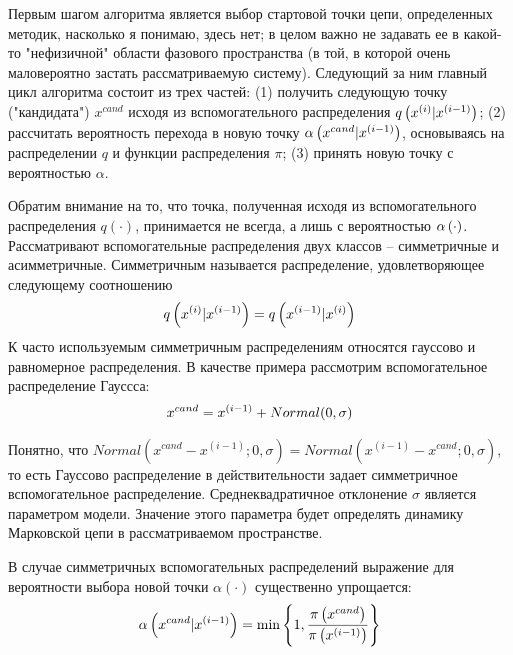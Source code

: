 Первым шагом алгоритма является выбор стартовой точки цепи, определенных методик, насколько я понимаю, здесь нет; в целом важно не задавать ее в какой-то "нефизичной" области фазового пространства (в той, в которой очень маловероятно застать рассматриваемую систему). Следующий за ним главный цикл алгоритма состоит из трех частей: (1) получить следующую точку ("кандидата") $x^{cand}$ исходя из вспомогательного распределения $q \left( x^{(i)} | x^{(i-1)} \right)$; (2) рассчитать вероятность перехода в новую точку $\alpha \left( x^{cand} | x^{(i-1)} \right)$, основываясь на распределении $q$ и функции распределения $\pi$; (3) принять новую точку с вероятностью $\alpha$. \par
Обратим внимание на то, что точка, полученная исходя из вспомогательного распределения $q(\cdot)$, принимается не всегда, а лишь с вероятностью $\alpha \left( \cdot \right)$. Рассматривают вспомогательные распределения двух классов -- симметричные и асимметричные. Симметричным называется распределение, удовлетворяющее следующему соотношению
\begin{gather}
		q \left( x^{(i)} | x^{(i-1)} \right) = q \left( x^{(i-1)} | x^{(i)} \right) \notag
\end{gather}
К часто используемым симметричным распределениям относятся гауссово и равномерное распределения. В качестве примера рассмотрим вспомогательное распределение Гауссса: 
\begin{gather}
		x^{cand} = x^{(i-1)} + Normal(0, \sigma) \notag
\end{gather}

Понятно, что $Normal( x^{cand} - x^{(i-1)}; 0, \sigma ) = Normal( x^{(i-1)} - x^{cand}; 0, \sigma)$, то есть Гауссово распределение в действительности задает симметричное вспомогательное распределение. Среднеквадратичное отклонение $\sigma$ является параметром модели. Значение этого параметра будет определять динамику Марковской цепи в рассматриваемом пространстве. \par
В случае симметричных вспомогательных распределений выражение для вероятности выбора новой точки $\alpha(\cdot)$ существенно упрощается:
\begin{gather}
		\alpha \left( x^{cand} | x^{(i-1)} \right) = \min \left\{ 1, \frac{\pi \left( x^{cand} \right)}{\pi \left( x^{(i - 1)} \right)} \right\} \notag 
\end{gather}

